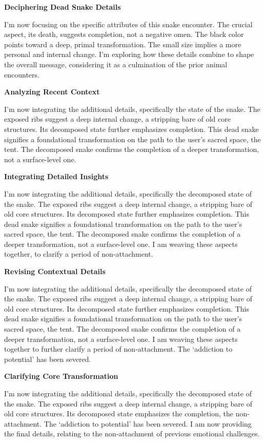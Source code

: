 \documentclass{article}
\begin{document}
\textbf{Deciphering Dead Snake Details}

I'm now focusing on the specific attributes of this snake encounter. The
crucial aspect, its death, suggests completion, not a negative omen. The
black color points toward a deep, primal transformation. The small size
implies a more personal and internal change. I'm exploring how these
details combine to shape the overall message, considering it as a
culmination of the prior animal encounters.

\textbf{Analyzing Recent Context}

I'm now integrating the additional details, specifically the state of
the snake. The exposed ribs suggest a deep internal change, a stripping
bare of old core structures. Its decomposed state further emphasizes
completion. This dead snake signifies a foundational transformation on
the path to the user's sacred space, the tent. The decomposed snake
confirms the completion of a deeper transformation, not a surface-level
one.

\textbf{Integrating Detailed Insights}

I'm now integrating the additional details, specifically the decomposed
state of the snake. The exposed ribs suggest a deep internal change, a
stripping bare of old core structures. Its decomposed state further
emphasizes completion. This dead snake signifies a foundational
transformation on the path to the user's sacred space, the tent. The
decomposed snake confirms the completion of a deeper transformation, not
a surface-level one. I am weaving these aspects together, to clarify a
period of non-attachment.

\textbf{Revising Contextual Details}

I'm now integrating the additional details, specifically the decomposed
state of the snake. The exposed ribs suggest a deep internal change, a
stripping bare of old core structures. Its decomposed state further
emphasizes completion. This dead snake signifies a foundational
transformation on the path to the user's sacred space, the tent. The
decomposed snake confirms the completion of a deeper transformation, not
a surface-level one. I am weaving these aspects together to further
clarify a period of non-attachment. The `addiction to potential' has
been severed.

\textbf{Clarifying Core Transformation}

I'm now integrating the additional details, specifically the decomposed
state of the snake. The exposed ribs suggest a deep internal change, a
stripping bare of old core structures. Its decomposed state emphasizes
the completion, the non-attachment. The `addiction to potential' has
been severed. I am now providing the final details, relating to the
non-attachment of previous emotional challenges.
\end{document}

